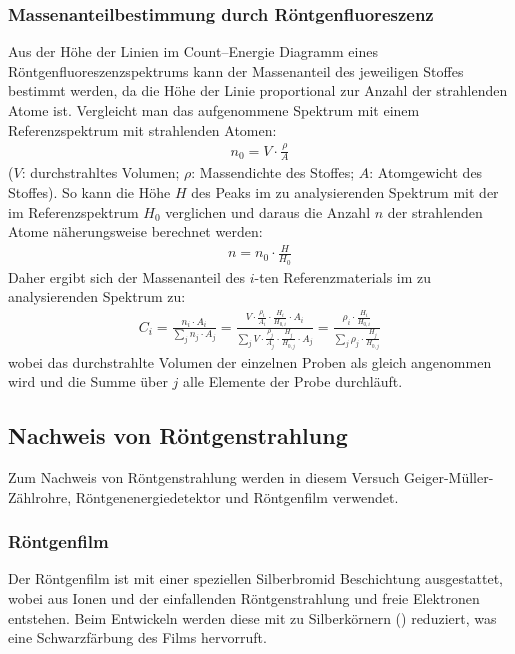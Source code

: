 \documentclass[11pt, a4paper]{article}
\begin{document}
\subsubsection{Massenanteilbestimmung durch Röntgenfluoreszenz}
Aus der Höhe der Linien im Count--Energie Diagramm eines Röntgenfluoreszenzspektrums kann der Massenanteil des jeweiligen Stoffes bestimmt werden, da die Höhe der Linie proportional zur Anzahl der strahlenden Atome ist.
Vergleicht man das aufgenommene Spektrum mit einem Referenzspektrum mit strahlenden Atomen:
\begin{align}
  n_0 = V \cdot \frac{\rho}{A}
\end{align}
($V$: durchstrahltes Volumen; $\rho$: Massendichte des Stoffes; $A$: Atomgewicht des Stoffes).
So kann die Höhe $H$ des Peaks im zu analysierenden Spektrum mit der im Referenzspektrum $H_0$ verglichen und daraus die Anzahl $n$ der strahlenden Atome näherungsweise berechnet werden:
\begin{align}
  n = n_0 \cdot \frac{H}{H_0}
\end{align}
Daher ergibt sich der Massenanteil des $i$-ten Referenzmaterials im zu analysierenden Spektrum zu:
\begin{align}
  C_i = \frac{n_i \cdot A_i}{\sum_j n_j \cdot A_j} = \frac{V \cdot \frac{\rho_i}{A_i} \cdot \frac{H_i}{H_{0,i}} \cdot A_i}{\sum_j V \cdot \frac{\rho_j}{A_j} \cdot \frac{H_j}{H_{0,j}}\cdot A_j} = \frac{\rho_i \cdot \frac{H_i}{H_{0,i}}}{\sum_j \rho_j \cdot \frac{H_j}{H_{0,j}}}
  \label{eq:massenanteile}
\end{align}
wobei das durchstrahlte Volumen der einzelnen Proben als gleich angenommen wird und die Summe über $j$ alle Elemente der Probe durchläuft.

\subsection{Nachweis von Röntgenstrahlung}
\label{sec:nachweis}
Zum Nachweis von Röntgenstrahlung werden in diesem Versuch Geiger-Müller-Zählrohre, Röntgenenergiedetektor und Röntgenfilm verwendet.

\subsubsection{Röntgenfilm}
Der Röntgenfilm ist mit einer speziellen Silberbromid Beschichtung ausgestattet, wobei aus  Ionen und der einfallenden Röntgenstrahlung  und freie Elektronen entstehen.
Beim Entwickeln werden diese mit  zu Silberkörnern () reduziert, was eine Schwarzfärbung des Films hervorruft.
\end{document}
